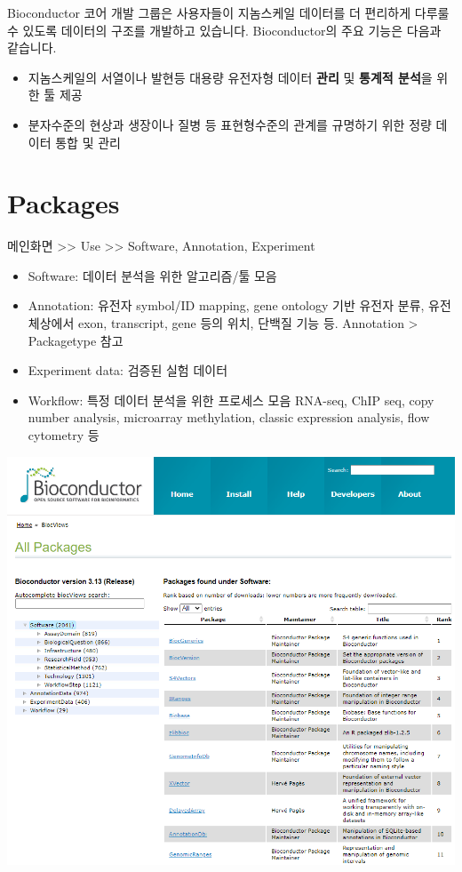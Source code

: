 \documentclass[
]{book}
\providecommand{\tightlist}{%
  \setlength{\itemsep}{0pt}\setlength{\parskip}{0pt}}
\begin{document}
Bioconductor 코어 개발 그룹은 사용자들이 지놈스케일 데이터를 더 편리하게 다루룰 수 있도록 데이터의 구조를 개발하고 있습니다. Bioconductor의 주요 기능은 다음과 같습니다.

\begin{itemize}
\tightlist
\item
  지놈스케일의 서열이나 발현등 대용량 유전자형 데이터 \textbf{관리} 및 \textbf{통계적 분석}을 위한 툴 제공
\item
  분자수준의 현상과 생장이나 질병 등 표현형수준의 관계를 규명하기 위한 정량 데이터 통합 및 관리
\end{itemize}

\hypertarget{packages}{%
\section{Packages}\label{packages}}

메인화면 \textgreater\textgreater{} Use \textgreater\textgreater{} Software, Annotation, Experiment

\begin{itemize}
\tightlist
\item
  Software: 데이터 분석을 위한 알고리즘/툴 모음
\item
  Annotation: 유전자 symbol/ID mapping, gene ontology 기반 유전자 분류, 유전체상에서 exon, transcript, gene 등의 위치, 단백질 기능 등. Annotation \textgreater{} Packagetype 참고
\item
  Experiment data: 검증된 실험 데이터
\item
  Workflow: 특정 데이터 분석을 위한 프로세스 모음 RNA-seq, ChIP seq, copy number analysis, microarray methylation, classic expression analysis, flow cytometry 등
\end{itemize}

\includegraphics[width=6.25in,height=\textheight]{images/bioconductor_list.PNG}
\end{document}
